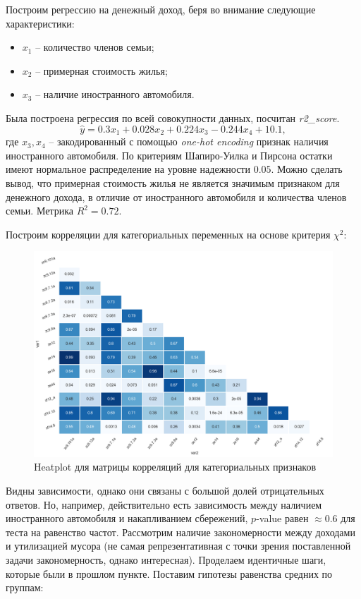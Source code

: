 \documentclass[12pt]{report}
\begin{document}
\par
Построим регрессию на денежный доход, беря во внимание следующие характеристики:
\begin{itemize}
  \item[] $x_1$ -- количество членов семьи;
  \item[] $x_2$ -- примерная стоимость жилья;
  \item[] $x_3$ -- наличие иностранного автомобиля. 
\end{itemize}
Была построена регрессия по всей совокупности данных, посчитан \emph{r2\_score}.
\[
  \hat{y} = 0.3x_1 + 0.028x_2 + 0.224x_3 - 0.244x_4 + 10.1,
\]
где $x_3, x_4$ -- закодированный с помощью \emph{one-hot encoding} признак наличия иностранного автомобиля.
По критериям Шапиро-Уилка и Пирсона остатки имеют нормальное распределение на уровне надежности $0.05$. Можно сделать вывод, что примерная стоимость жилья не является значимым признаком для денежного дохода, в отличие от иностранного автомобиля и количества членов семьи. Метрика $R^2 = 0.72$.
\par 
Построим корреляции для категориальных переменных на основе критерия $\chi^2$:
\begin{figure}[H]
  \centering
  \includegraphics[scale=0.6]{title/corrlation_categorical.png}
  \caption{Heatplot для матрицы корреляций для категориальных признаков}
\end{figure}
Видны зависимости, однако они связаны с большой долей отрицательных ответов. Но, например, действительно есть зависимость между наличием иностранного автомобиля и накапливанием сбережений, $p$-value равен $\approx 0.6$ для теста на равенство частот. Рассмотрим наличие закономерности между доходами и утилизацией мусора (не самая репрезентативная с точки зрения поставленной задачи закономерность, однако интересная). Проделаем идентичные шаги, которые были в прошлом пункте. Поставим гипотезы равенства средних по группам:
\end{document}
